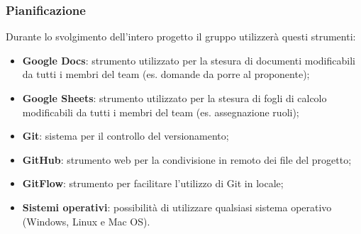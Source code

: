 \subsubsection{Pianificazione}











Durante lo svolgimento dell'intero progetto il gruppo utilizzerà questi strumenti:
\begin{itemize}
	\item \textbf{Google Docs}: strumento utilizzato per la stesura di documenti modificabili da tutti i membri del team (es. domande da porre al proponente);
	\item \textbf{Google Sheets}: strumento utilizzato per la stesura di fogli di calcolo modificabili da tutti i membri del team (es. assegnazione ruoli);
	\item \textbf{Git}: sistema per il controllo del versionamento;
	\item \textbf{GitHub}: strumento web per la condivisione in remoto dei file del progetto;
	\item \textbf{GitFlow}: strumento per facilitare l'utilizzo di Git in locale;
	\item \textbf{Sistemi operativi}: possibilità di utilizzare qualsiasi sistema operativo (Windows, Linux e Mac OS).
\end{itemize}

